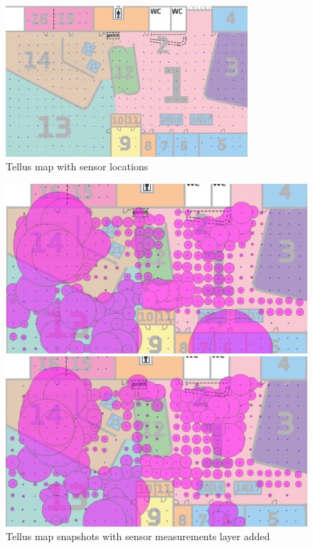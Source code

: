 \documentclass{article}
\begin{document}
\begin{figure}[ht!]
  \centering
  \includegraphics[width=90mm]{./tellus_map_sensor_locations.png}
  \caption{Tellus map with sensor locations}
\end{figure}

\begin{figure}[ht!]
  \centering
  \begin{minipage}{.5\textwidth}
    \centering
    \includegraphics[width=.95\linewidth]{./tellus_map_sensor_data_1.png}
  \end{minipage}%
  \begin{minipage}{.5\textwidth}
    \centering
    \includegraphics[width=.95\linewidth]{./tellus_map_sensor_data_2.png}
  \end{minipage}
  \caption{Tellus map snapshots with sensor measurements layer added}
\end{figure}
\end{document}
